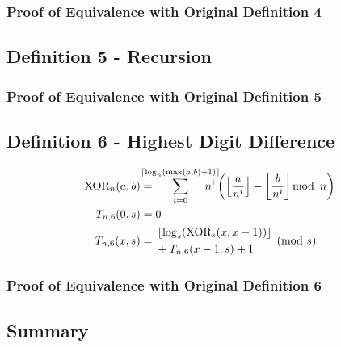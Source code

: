 \documentclass[conference]{IEEEtran}
\begin{document}
\subsubsection{Proof of Equivalence with Original Definition 4}

\subsection{Definition 5 - Recursion}


\subsubsection{Proof of Equivalence with Original Definition 5}

\subsection{Definition 6 - Highest Digit Difference}

\begin{equation}
    \begin{aligned}
\text{XOR}_{n}(a, b) &= \hspace{-13pt} \sum_{i=0}^{\ceil{\log_{n}(\max(a,b) + 1)}} \hspace{-15pt} n^i \left(\floor{\dfrac{a}{n^i}} - \floor{\dfrac{b}{n^i}} \mod{n}\right) \\
       T_{n,6}(0, s) &= 0 \\
       T_{n,6}(x, s) &= \begin{aligned}[c]
           &\floor{\log_s(\text{XOR}_{s}(x, x - 1))} \\
           &+ T_{n,6}(x - 1, s) + 1
       \end{aligned} \pmod{s}
    \end{aligned}
\end{equation}



\subsubsection{Proof of Equivalence with Original Definition 6}

\subsection{Summary}
\end{document}
